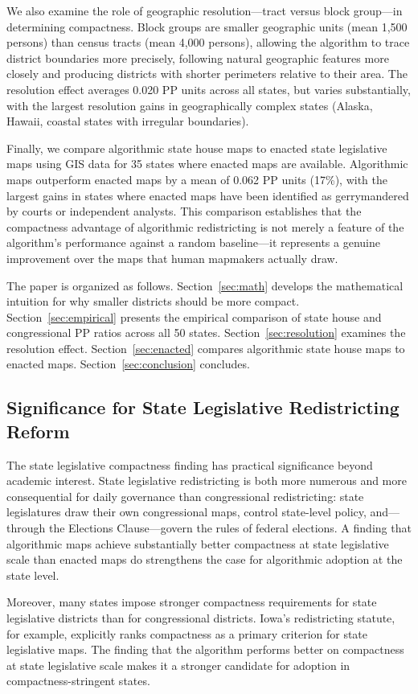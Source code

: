 We also examine the role of geographic resolution---tract versus block group---in determining compactness. Block groups are smaller geographic units (mean 1,500 persons) than census tracts (mean 4,000 persons), allowing the algorithm to trace district boundaries more precisely, following natural geographic features more closely and producing districts with shorter perimeters relative to their area. The resolution effect averages 0.020 PP units across all states, but varies substantially, with the largest resolution gains in geographically complex states (Alaska, Hawaii, coastal states with irregular boundaries).

Finally, we compare algorithmic state house maps to enacted state legislative maps using GIS data for 35 states where enacted maps are available. Algorithmic maps outperform enacted maps by a mean of 0.062 PP units (17\%), with the largest gains in states where enacted maps have been identified as gerrymandered by courts or independent analysts. This comparison establishes that the compactness advantage of algorithmic redistricting is not merely a feature of the algorithm's performance against a random baseline---it represents a genuine improvement over the maps that human mapmakers actually draw.

The paper is organized as follows. Section~\ref{sec:math} develops the mathematical intuition for why smaller districts should be more compact. Section~\ref{sec:empirical} presents the empirical comparison of state house and congressional PP ratios across all 50 states. Section~\ref{sec:resolution} examines the resolution effect. Section~\ref{sec:enacted} compares algorithmic state house maps to enacted maps. Section~\ref{sec:conclusion} concludes.

\subsection{Significance for State Legislative Redistricting Reform}

The state legislative compactness finding has practical significance beyond academic interest. State legislative redistricting is both more numerous and more consequential for daily governance than congressional redistricting: state legislatures draw their own congressional maps, control state-level policy, and—through the Elections Clause---govern the rules of federal elections. A finding that algorithmic maps achieve substantially better compactness at state legislative scale than enacted maps do strengthens the case for algorithmic adoption at the state level.

Moreover, many states impose stronger compactness requirements for state legislative districts than for congressional districts. Iowa's redistricting statute, for example, explicitly ranks compactness as a primary criterion for state legislative maps. The finding that the algorithm performs better on compactness at state legislative scale makes it a stronger candidate for adoption in compactness-stringent states.
